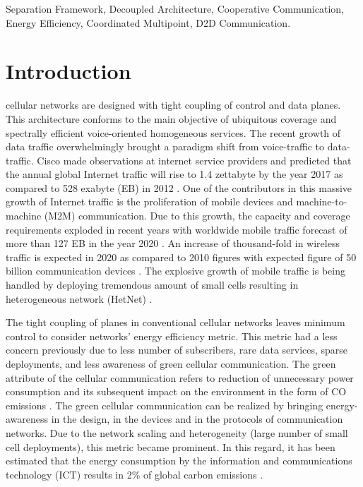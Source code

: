 \documentclass[article,10pt,twocolumn]{IEEEtran}
\begin{document}
\begin{IEEEkeywords}
Separation Framework, Decoupled Architecture, Cooperative Communication, Energy Efficiency, Coordinated Multipoint, D2D Communication.
\end{IEEEkeywords}

\section{Introduction} \label{sec:introduction}
 cellular networks are designed with tight coupling of control and data planes. This architecture conforms to the main objective of ubiquitous coverage and spectrally efficient voice-oriented homogeneous services. The recent growth of data traffic overwhelmingly brought a paradigm shift from voice-traffic to data-traffic. Cisco made observations at internet service providers and predicted that the annual global Internet traffic will rise to 1.4 zettabyte by the year 2017 as compared to 528 exabyte (EB) in 2012 \citep{Cisco}. One of the contributors in this massive growth of Internet traffic is the proliferation of mobile devices and machine-to-machine (M2M) communication. Due to this growth, the capacity and coverage requirements exploded in recent years with worldwide mobile traffic forecast of more than 127 EB in the year 2020 \citep{UMTS_2011}. An increase of thousand-fold in wireless traffic is expected in 2020 as compared to 2010 figures \citep{6692781} with expected figure of 50 billion communication devices \citep{Ericsson_2011}. The explosive growth of mobile traffic is being handled by deploying tremendous amount of small cells resulting in heterogeneous network (HetNet) \citep{6171992}.

The tight coupling of planes in conventional cellular networks leaves minimum control to consider networks' energy efficiency metric. This metric had a less concern previously due to less number of subscribers, rare data services, sparse deployments, and less awareness of green cellular communication. The green attribute of the cellular communication refers to reduction of unnecessary power consumption and its subsequent impact on the environment in the form of CO emissions \citep{5677351,wu_green_2012,scott_matthews_planning_2010,5978416,6848019,6525595}. The green cellular communication can be realized by bringing energy-awareness in the design, in the devices \citep{4205092} and in the protocols of communication networks. Due to the network scaling and heterogeneity (large number of small cell deployments), this metric became prominent. In this regard, it has been estimated that the energy consumption by the information and communications technology (ICT) results in 2\% of global carbon emissions \citep{6100924}.
\end{document}
